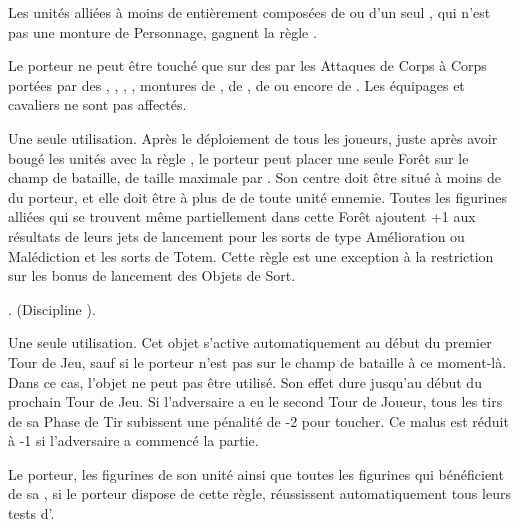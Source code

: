 \endpricelist

\armytalismans

\startpricelist

Les unités alliées à moins de  entièrement composées de \razortusks{} ou d'un seul \chariot{}, qui n'est pas une monture de Personnage, gagnent la règle \vanguard{}.

Le porteur ne peut être touché que sur des  par les Attaques de Corps à Corps portées par des \swarms{}, \warbeasts{}, \monstrousbeasts{}, \monsters{}, montures de \cavalry{}, de \monstrouscavalry{}, de \riddenmonsters{} ou encore de \chariots{}. Les équipages et cavaliers ne sont pas affectés.

\endpricelist

\armyenchanteditems

\startpricelist

Une seule utilisation. Après le déploiement de tous les joueurs, juste après avoir bougé les unités avec la règle \vanguard{}, le porteur peut placer une seule Forêt sur le champ de bataille,  de taille maximale  par . Son centre doit être situé à moins de  du porteur, et elle doit être à plus de  de toute unité ennemie. Toutes les figurines alliées qui se trouvent même partiellement dans cette Forêt ajoutent +1 aux résultats de leurs jets de lancement pour les sorts de type Amélioration ou Malédiction et les sorts de Totem. Cette règle est une exception à la restriction sur les bonus de lancement des Objets de Sort.

. \wildernessspellone{} (Discipline \wilderness{}).

Une seule utilisation. Cet objet s'active automatiquement au début du premier Tour de Jeu, sauf si le porteur n'est pas sur le champ de bataille à ce moment-là. Dans ce cas, l'objet ne peut pas être utilisé. Son effet dure jusqu'au début du prochain Tour de Jeu. Si l'adversaire a eu le second Tour de Joueur, tous les tirs de sa Phase de Tir subissent une pénalité de -2 pour toucher. Ce malus est réduit à -1 si l'adversaire a commencé la partie.

Le porteur, les figurines de son unité ainsi que toutes les figurines qui bénéficient de sa \inspiringpresence{}, si le porteur dispose de cette règle, réussissent automatiquement tous leurs tests d'\primalinstinct{}.

